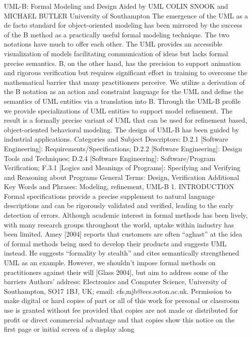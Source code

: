 UML-B: Formal Modeling and Design
Aided by UML
COLIN SNOOK and MICHAEL BUTLER
University of Southampton
The emergence of the UML as a de facto standard for object-oriented modeling has been mirrored
by the success of the B method as a practically useful formal modeling technique. The two notations
have much to offer each other. The UML provides an accessible visualization of models facilitating
communication of ideas but lacks formal precise semantics. B, on the other hand, has the precision
to support animation and rigorous verification but requires significant effort in training to overcome
the mathematical barrier that many practitioners perceive. We utilize a derivation of the B notation
as an action and constraint language for the UML and define the semantics of UML entities via
a translation into B. Through the UML-B profile we provide specializations of UML entities to
support model refinement. The result is a formally precise variant of UML that can be used for
refinement based, object-oriented behavioral modeling. The design of UML-B has been guided by
industrial applications.
Categories and Subject Descriptors: D.2.1 [Software Engineering]: Requirements/Specifications;
D.2.2 [Software Engineering]: Design Tools and Techniques; D.2.4 [Software Engineering]:
Software/Program Verification; F.3.1 [Logics and Meanings of Programs]: Specifying and Verifying and Reasoning about Programs
General Terms: Design, Verification
Additional Key Words and Phrases: Modeling, refinement, UML-B
1. INTRODUCTION
Formal specifications provide a precise supplement to natural language descriptions and can be rigorously validated and verified, leading to the early detection
of errors. Although academic interest in formal methods has been lively, with
many research groups throughout the world, uptake within industry has been
limited. Amey [2004] reports that customers are often “aghast” at the idea of
formal methods being used to develop their products and suggests UML instead. He suggests “formality by stealth” and cites semantically strengthened
UML as an example. However, we shouldn’t impose formal methods on practitioners against their will [Glass 2004], but aim to address some of the barriers
Authors’ address: Electronics and Computer Science, University of Southampton, SO17 1BJ, UK;
email: {cfs,mjb}@ecs.soton.ac.uk.
Permission to make digital or hard copies of part or all of this work for personal or classroom use is
granted without fee provided that copies are not made or distributed for profit or direct commercial
advantage and that copies show this notice on the first page or initial screen of a display along
